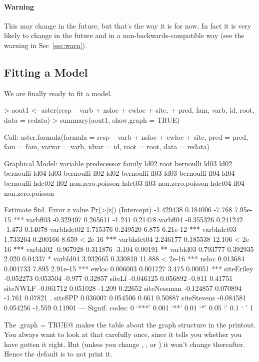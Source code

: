 \documentclass[11pt]{article}
\begin{document}
\paragraph{Warning}
This may change in the future, but that's the way it is for now.
In fact it is very likely to change in the future and in a
non-backwards-compatible way (see the warning in Sec~\ref{sec:warn}).

\subsection{Fitting a Model}

We are finally ready to fit a model.
\begin{Schunk}
\begin{Sinput}
> aout1 <- aster(resp ~ varb + nsloc + ewloc + site, 
+     pred, fam, varb, id, root, data = redata)
> summary(aout1, show.graph = TRUE)
\end{Sinput}
\begin{Soutput}
Call:
aster.formula(formula = resp ~ varb + nsloc + ewloc + site, pred = pred, 
    fam = fam, varvar = varb, idvar = id, root = root, data = redata)


Graphical Model:
 variable predecessor family          
 ld02     root        bernoulli       
 ld03     ld02        bernoulli       
 ld04     ld03        bernoulli       
 fl02     ld02        bernoulli       
 fl03     ld03        bernoulli       
 fl04     ld04        bernoulli       
 hdct02   fl02        non.zero.poisson
 hdct03   fl03        non.zero.poisson
 hdct04   fl04        non.zero.poisson

             Estimate Std. Error z value Pr(>|z|)    
(Intercept) -1.429438   0.184006  -7.768 7.95e-15 ***
varbfl03    -0.329497   0.265611  -1.241  0.21478    
varbfl04    -0.355326   0.241242  -1.473  0.14078    
varbhdct02   1.715376   0.249520   6.875 6.21e-12 ***
varbhdct03   1.733264   0.200166   8.659  < 2e-16 ***
varbhdct04   2.246177   0.185538  12.106  < 2e-16 ***
varbld02    -0.967928   0.311876  -3.104  0.00191 ** 
varbld03     0.793777   0.392935   2.020  0.04337 *  
varbld04     3.932665   0.330810  11.888  < 2e-16 ***
nsloc        0.013684   0.001733   7.895 2.91e-15 ***
ewloc        0.006003   0.001727   3.475  0.00051 ***
siteEriley  -0.052273   0.053504  -0.977  0.32857    
siteLf      -0.046125   0.056892  -0.811  0.41751    
siteNWLF    -0.061712   0.051028  -1.209  0.22652    
siteNessman -0.124857   0.070894  -1.761  0.07821 .  
siteSPP      0.036007   0.054506   0.661  0.50887    
siteStevens -0.084581   0.054256  -1.559  0.11901    
---
Signif. codes:  0 `***' 0.001 `**' 0.01 `*' 0.05 `.' 0.1 ` ' 1 
\end{Soutput}
\end{Schunk}
The \verb@show.graph = TRUE@ makes the table about the graph structure
in the printout.  You always want to look at that carefully once, since
it tells you whether you have gotten it right.  But (unless you change
\verb@redata@, \verb@pred@, or \verb@fam@) it won't change thereafter.
Hence the default is to not print it.
\end{document}
